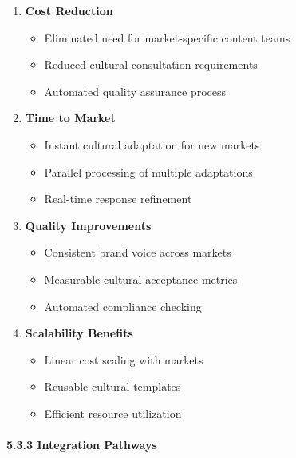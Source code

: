 \documentclass[
]{article}
\providecommand{\tightlist}{%
  \setlength{\itemsep}{0pt}\setlength{\parskip}{0pt}}
\begin{document}
\begin{enumerate}
\def\labelenumi{\arabic{enumi}.}
\tightlist
\item
  \textbf{Cost Reduction}

  \begin{itemize}
  \tightlist
  \item
    Eliminated need for market-specific content teams
  \item
    Reduced cultural consultation requirements
  \item
    Automated quality assurance process
  \end{itemize}
\item
  \textbf{Time to Market}

  \begin{itemize}
  \tightlist
  \item
    Instant cultural adaptation for new markets
  \item
    Parallel processing of multiple adaptations
  \item
    Real-time response refinement
  \end{itemize}
\item
  \textbf{Quality Improvements}

  \begin{itemize}
  \tightlist
  \item
    Consistent brand voice across markets
  \item
    Measurable cultural acceptance metrics
  \item
    Automated compliance checking
  \end{itemize}
\item
  \textbf{Scalability Benefits}

  \begin{itemize}
  \tightlist
  \item
    Linear cost scaling with markets
  \item
    Reusable cultural templates
  \item
    Efficient resource utilization
  \end{itemize}
\end{enumerate}

\paragraph{5.3.3 Integration Pathways}\label{integration-pathways}
\end{document}
